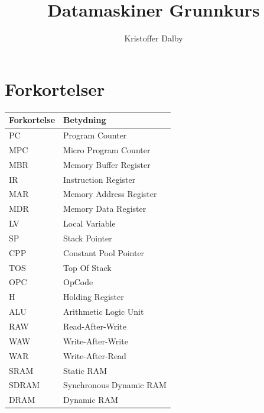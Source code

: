 \documentclass[a4paper, 10pt]{article}
\title{Datamaskiner Grunnkurs}
\author{Kristoffer Dalby}
\date{}
\begin{document}
\maketitle

\thispagestyle{empty}
\newpage
{}
\setcounter{page}{1}

\section{Forkortelser}
 \begin{tabular}{|l|l|}
    \hline
    Forkortelse & Betydning                        \\ \hline
    PC          & Program Counter                  \\ \hline
    MPC         & Micro Program Counter            \\ \hline
    MBR         & Memory Buffer Register           \\ \hline
    IR          & Instruction Register             \\ \hline
    MAR         & Memory Address Register          \\ \hline
    MDR         & Memory Data Register             \\ \hline
    LV          & Local Variable                   \\ \hline
    SP          & Stack Pointer                    \\ \hline
    CPP         & Constant Pool Pointer            \\ \hline
    TOS         & Top Of Stack                     \\ \hline
    OPC         & OpCode                           \\ \hline
    H           & Holding Register                 \\ \hline
    ALU         & Arithmetic Logic Unit            \\ \hline
    RAW         & Read-After-Write                 \\ \hline
    WAW         & Write-After-Write                \\ \hline
    WAR         & Write-After-Read                 \\ \hline
    SRAM        & Static RAM                       \\ \hline
    SDRAM       & Synchronous Dynamic RAM          \\ \hline
    DRAM        & Dynamic RAM                      \\ \hline

\end{tabular}
\end{document}
